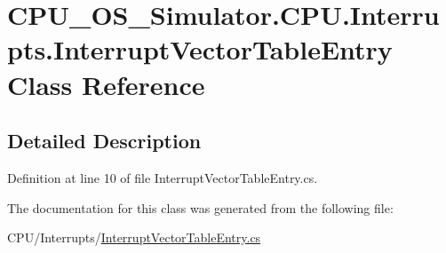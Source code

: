 \hypertarget{class_c_p_u___o_s___simulator_1_1_c_p_u_1_1_interrupts_1_1_interrupt_vector_table_entry}{}\section{C\+P\+U\+\_\+\+O\+S\+\_\+\+Simulator.\+C\+P\+U.\+Interrupts.\+Interrupt\+Vector\+Table\+Entry Class Reference}
\label{class_c_p_u___o_s___simulator_1_1_c_p_u_1_1_interrupts_1_1_interrupt_vector_table_entry}


\subsection{Detailed Description}


Definition at line 10 of file Interrupt\+Vector\+Table\+Entry.\+cs.



The documentation for this class was generated from the following file\+:\begin{DoxyCompactItemize}
\item 
C\+P\+U/\+Interrupts/\hyperlink{_interrupt_vector_table_entry_8cs}{Interrupt\+Vector\+Table\+Entry.\+cs}\end{DoxyCompactItemize}
